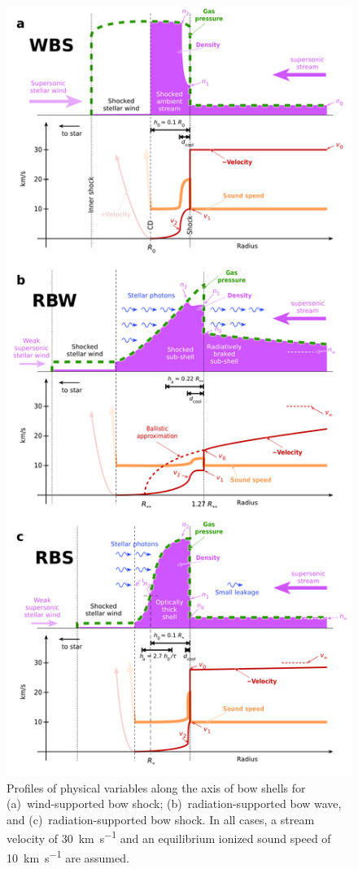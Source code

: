 \begin{figure}
  \centering
  \includegraphics[width=\linewidth]{figs/shell-profiles}
  \caption{Profiles of physical variables along the axis of bow shells
    for (a)~wind-supported bow shock; (b)~radiation-supported bow
    wave, and (c)~radiation-supported bow shock.  In all cases, a
    stream velocity of \SI{30}{km.s^{-1}} and an equilibrium ionized
    sound speed of \SI{10}{km.s^{-1}} are assumed.}
  \label{fig:axial-structure}
\end{figure}


